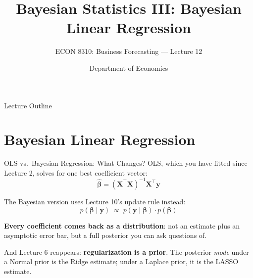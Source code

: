 \documentclass[aspectratio=169, 11pt]{beamer}
\title[Bayesian III: Regression]{Bayesian Statistics III: Bayesian Linear Regression}
\subtitle{ECON 8310: Business Forecasting --- Lecture 12}
\author{Department of Economics}
\institute{University of Nebraska at Omaha}
\begin{document}

\begin{frame}
  \titlepage
\end{frame}

\begin{frame}{Lecture Outline}
  \tableofcontents
\end{frame}

\section{Bayesian Linear Regression}


\begin{frame}{OLS vs.\ Bayesian Regression: What Changes?}
  OLS, which you have fitted since Lecture 2, solves for one best coefficient vector:
  \[
    \hat{\boldsymbol{\beta}} = (\mathbf{X}^{\top}\mathbf{X})^{-1}\mathbf{X}^{\top}\mathbf{y}
  \]
  \vspace{-0.25cm}

  The Bayesian version uses Lecture 10's update rule instead:
  \[
    p(\boldsymbol{\beta} \mid \mathbf{y}) \;\propto\; p(\mathbf{y} \mid \boldsymbol{\beta}) \cdot p(\boldsymbol{\beta})
  \]
  \vspace{-0.25cm}

  \begin{keybox}
    \textbf{Every coefficient comes back as a distribution}: not an estimate plus an asymptotic
    error bar, but a full posterior you can ask questions of.
  \end{keybox}

  And Lecture 6 reappears: \textbf{regularization is a prior}. The posterior \emph{mode} under a
  Normal prior is the Ridge estimate; under a Laplace prior, it is the LASSO estimate.
\end{frame}
\end{document}
